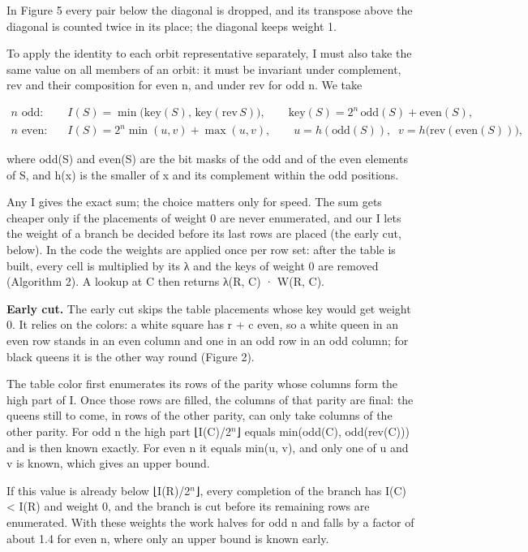 In Figure 5 every pair below the diagonal is dropped, and its transpose above the diagonal is counted twice in its place; the diagonal keeps weight 1.

To apply the identity to each orbit representative separately, I must also take the same value on all members of an orbit: it must be invariant under complement, rev and their composition for even n, and under rev for odd n. We take

\[\begin{aligned} n \text{ odd:}\quad & I(S) = \min\bigl(\mathrm{key}(S),\, \mathrm{key}(\mathrm{rev}\,S)\bigr), \qquad \mathrm{key}(S) = 2^{n}\,\mathrm{odd}(S) + \mathrm{even}(S),\\ n \text{ even:}\quad & I(S) = 2^{n} \min(u, v) + \max(u, v), \qquad u = h(\mathrm{odd}(S)),\;\; v = h\bigl(\mathrm{rev}(\mathrm{even}(S))\bigr), \end{aligned}\]

where odd(S) and even(S) are the bit masks of the odd and of the even elements of S, and h(x) is the smaller of x and its complement within the odd positions.

Any I gives the exact sum; the choice matters only for speed. The sum gets cheaper only if the placements of weight 0 are never enumerated, and our I lets the weight of a branch be decided before its last rows are placed (the early cut, below). In the code the weights are applied once per row set: after the table is built, every cell is multiplied by its λ and the keys of weight 0 are removed (Algorithm 2). A lookup at C then returns λ(R, C) · W(R, C).

\textbf{Early cut.} The early cut skips the table placements whose key would get weight 0. It relies on the colors: a white square has r + c even, so a white queen in an even row stands in an even column and one in an odd row in an odd column; for black queens it is the other way round (Figure 2).

The table color first enumerates its rows of the parity whose columns form the high part of I. Once those rows are filled, the columns of that parity are final: the queens still to come, in rows of the other parity, can only take columns of the other parity. For odd n the high part ⌊I(C)/2$^{n}$⌋ equals min(odd(C), odd(rev(C))) and is then known exactly. For even n it equals min(u, v), and only one of u and v is known, which gives an upper bound.

If this value is already below ⌊I(R)/2$^{n}$⌋, every completion of the branch has I(C) < I(R) and weight 0, and the branch is cut before its remaining rows are enumerated. With these weights the work halves for odd n and falls by a factor of about 1.4 for even n, where only an upper bound is known early.

